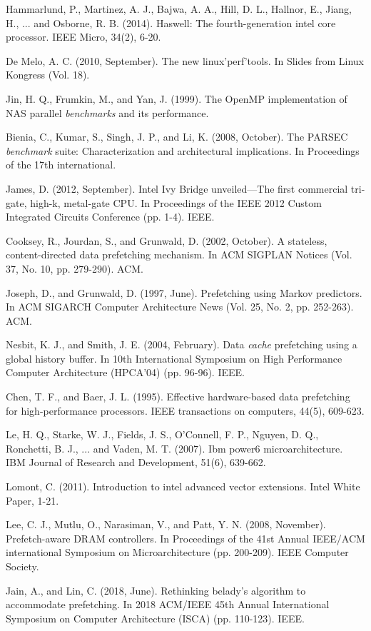 \documentclass[12pt]{article}
\begin{document}
\begin{thebibliography}{00}
Hammarlund, P., Martinez, A. J., Bajwa, A. A., Hill, D. L., Hallnor, E., Jiang, H., ... and Osborne, R. B. (2014). Haswell: The fourth-generation intel core processor. IEEE Micro, 34(2), 6-20.

De Melo, A. C. (2010, September). The new linux’perf’tools. In Slides from Linux Kongress (Vol. 18).

Jin, H. Q., Frumkin, M., and Yan, J. (1999). The OpenMP implementation of NAS parallel \emph{benchmarks} and its performance.

 Bienia, C., Kumar, S., Singh, J. P., and Li, K. (2008, October). The PARSEC \emph{benchmark} suite: Characterization and architectural implications. In Proceedings of the 17th international.

 James, D. (2012, September). Intel Ivy Bridge unveiled—The first commercial tri-gate, high-k, metal-gate CPU. In Proceedings of the IEEE 2012 Custom Integrated Circuits Conference (pp. 1-4). IEEE.

 Cooksey, R., Jourdan, S., and Grunwald, D. (2002, October). A stateless, content-directed data prefetching mechanism. In ACM SIGPLAN Notices (Vol. 37, No. 10, pp. 279-290). ACM.

 Joseph, D., and Grunwald, D. (1997, June). Prefetching using Markov predictors. In ACM SIGARCH Computer Architecture News (Vol. 25, No. 2, pp. 252-263). ACM.

 Nesbit, K. J., and Smith, J. E. (2004, February). Data \emph{cache} prefetching using a global history buffer. In 10th International Symposium on High Performance Computer Architecture (HPCA'04) (pp. 96-96). IEEE.

 Chen, T. F., and Baer, J. L. (1995). Effective hardware-based data prefetching for high-performance processors. IEEE transactions on computers, 44(5), 609-623.

 Le, H. Q., Starke, W. J., Fields, J. S., O'Connell, F. P., Nguyen, D. Q., Ronchetti, B. J., ... and Vaden, M. T. (2007). Ibm power6 microarchitecture. IBM Journal of Research and Development, 51(6), 639-662.

 Lomont, C. (2011). Introduction to intel advanced vector extensions. Intel White Paper, 1-21.

 Lee, C. J., Mutlu, O., Narasiman, V., and Patt, Y. N. (2008, November). Prefetch-aware DRAM controllers. In Proceedings of the 41st Annual IEEE/ACM international Symposium on Microarchitecture (pp. 200-209). IEEE Computer Society.

 Jain, A., and Lin, C. (2018, June). Rethinking belady's algorithm to accommodate prefetching. In 2018 ACM/IEEE 45th Annual International Symposium on Computer Architecture (ISCA) (pp. 110-123). IEEE.

\end{thebibliography}

\fi 
\vspace{-2mm}


\end{document}
